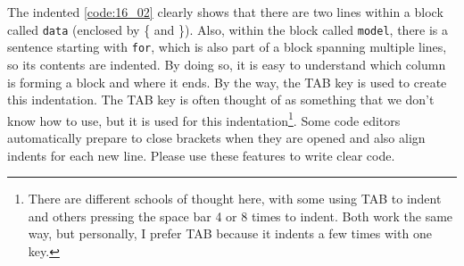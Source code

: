 \documentclass{ltjsbook}
\begin{document}

The indented \ref{code:16_02} clearly shows that there are two lines within a block called \texttt{data} (enclosed by \{ and \}). Also, within the block called \texttt{model}, there is a sentence starting with \texttt{for}, which is also part of a block spanning multiple lines, so its contents are indented. By doing so, it is easy to understand which column is forming a block and where it ends. By the way, the TAB key is used to create this indentation. The TAB key is often thought of as something that we don't know how to use, but it is used for this indentation\footnote{There are different schools of thought here, with some using TAB to indent and others pressing the space bar 4 or 8 times to indent. Both work the same way, but personally, I prefer TAB because it indents a few times with one key.}. Some code editors automatically prepare to close brackets when they are opened and also align indents for each new line. Please use these features to write clear code.
\end{document}
